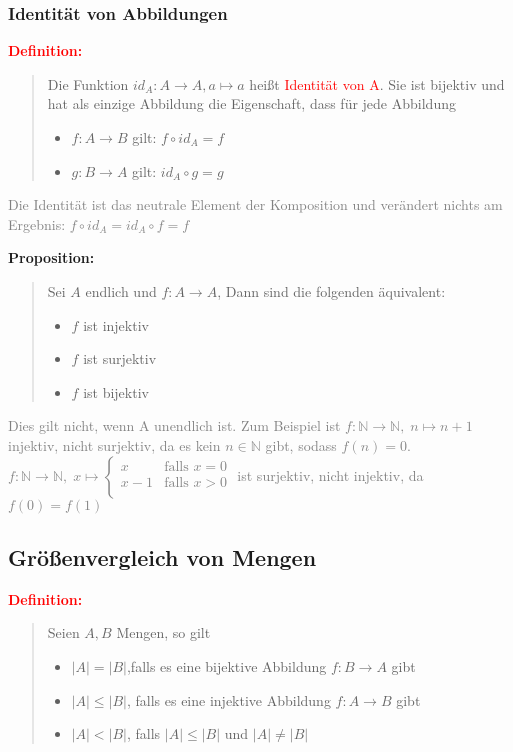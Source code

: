 \documentclass{article}
\newcommand{\red}[1]{\textcolor{red}{#1}}
\newcommand{\gray}[1]{\textcolor{gray}{#1}}
\newcommand{\dgr}[1]{\textcolor{dgr}{#1}}
\newcommand{\de}[1]{\red{\textbf{Definition: }}\begin{quote}#1\end{quote}}
\newcommand{\prop}[1]{\dgr{\textbf{Proposition: }}\begin{quote}#1\end{quote}}
\newcommand{\N}{\mathbb{N}}
\begin{document}
\newpage
\subsubsection{Identität von Abbildungen}

\de{Die Funktion $id_A: A \to A, a \mapsto a$ heißt \red{Identität von A}. Sie ist bijektiv und hat als einzige Abbildung die Eigenschaft, dass für jede Abbildung
\begin{itemize}
    \item $f: A \to B$ gilt: $f \circ id_A = f$
    \item $g: B \to A$ gilt: $id_A \circ g = g$
\end{itemize}
}
\gray{Die Identität ist das neutrale Element der Komposition und verändert nichts am Ergebnis: $f \circ id_A = id_A \circ f = f$}

\prop{Sei $A$ endlich und $f: A \to A$, Dann sind die folgenden äquivalent:
\begin{itemize}
    \item $f$ ist injektiv
    \item $f$ ist surjektiv
    \item $f$ ist bijektiv
\end{itemize}
}
\gray{Dies gilt nicht, wenn A unendlich ist. Zum Beispiel ist $f: \N \to \N, \; n \mapsto n + 1$ injektiv, nicht surjektiv, da es kein $n \in \N$ gibt, sodass $f(n) = 0$.\\
$f: \N \to \N, \; x \mapsto \begin{cases}
    x & \text{falls } x = 0\\
    x - 1 & \text{falls } x > 0\\
\end{cases}$
ist surjektiv, nicht injektiv, da $f(0) = f(1)$
}

\subsection{Größenvergleich von Mengen}

\de{Seien $A, B$ Mengen, so gilt
    \begin{itemize}
        \item $|A| = |B|$,falls es eine bijektive Abbildung $f: B \to A$ gibt
        \item $|A| \leq |B|$, falls es eine injektive Abbildung $f: A \to B$ gibt
        \item $|A| < |B|$, falls $|A| \leq |B|$ und $|A| \neq |B|$
    \end{itemize}
}
\end{document}
